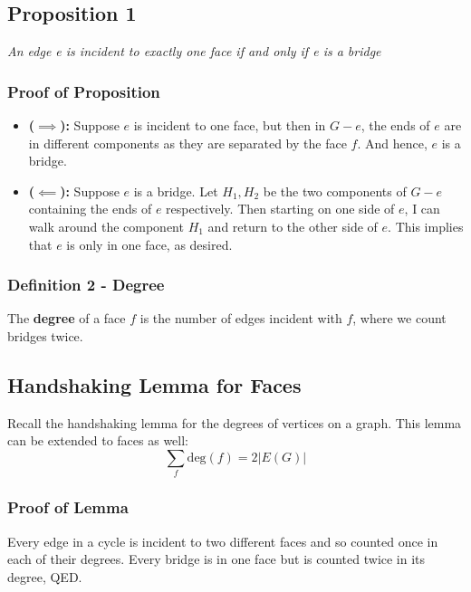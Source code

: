\documentclass{report}
\begin{document}
\subsection{Proposition 1}
\begin{center}
\textit{An edge e is incident to exactly one face if and only if e is a bridge}
\end{center}
\subsubsection{Proof of Proposition}
\begin{itemize}
\item \textbf{($\implies$):} Suppose $e$ is incident to one face, but then in $G-e$, the ends of $e$ are in different components as they are separated by the face $f$. And hence, $e$ is a bridge.
\item \textbf{($\impliedby$):} Suppose $e$ is a bridge. Let $H_1, H_2$ be the two components of $G - e$ containing the ends of $e$ respectively. Then starting on one side of $e$, I can walk around the component $H_1$ and return to the other side of $e$. This implies that $e$ is only in one face, as desired.
\end{itemize}
\subsubsection{Definition 2 - Degree}
The \textbf{degree} of a face $f$ is the number of edges incident with $f$, where we count bridges twice.
\subsection{Handshaking Lemma for Faces}
Recall the handshaking lemma for the degrees of vertices on a graph. This lemma can be extended to faces as well:
$$\sum_{f} \mathrm{deg}(f) = 2\vert E(G) \vert$$
\subsubsection{Proof of Lemma}
Every edge in a cycle is incident to two different faces and so counted once in each of their degrees. Every bridge is in one face but is counted twice in its degree, QED.
\end{document}
